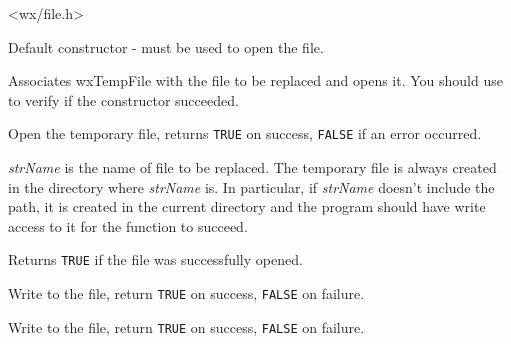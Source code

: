 
<wx/file.h>




\label{wxtempfilewxtempfilector}


Default constructor -  must be used to open the
file.

\label{wxtempfilewxtempfile}


Associates wxTempFile with the file to be replaced and opens it. You should use 
 to verify if the constructor succeeded.

\label{wxtempfileopen}


Open the temporary file, returns {\tt TRUE} on success, {\tt FALSE} if an error
occurred.

{\it strName} is the name of file to be replaced. The temporary file is always
created in the directory where {\it strName} is. In particular, if 
{\it strName} doesn't include the path, it is created in the current directory
and the program should have write access to it for the function to succeed.

\label{wxtempfileisopened}


Returns {\tt TRUE} if the file was successfully opened.

\label{wxtempfilewrite}


Write to the file, return {\tt TRUE} on success, {\tt FALSE} on failure.

\label{wxtempfilewrites}


Write to the file, return {\tt TRUE} on success, {\tt FALSE} on failure.

